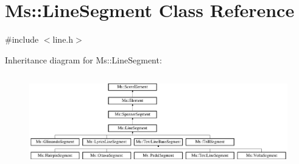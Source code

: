 \hypertarget{class_ms_1_1_line_segment}{}\section{Ms\+:\+:Line\+Segment Class Reference}
\label{class_ms_1_1_line_segment}


{\ttfamily \#include $<$line.\+h$>$}

Inheritance diagram for Ms\+:\+:Line\+Segment\+:\begin{figure}[H]
\begin{center}
\leavevmode
\includegraphics[height=4.048193cm]{class_ms_1_1_line_segment}
\end{center}
\end{figure}
